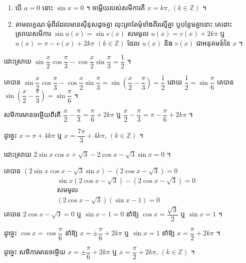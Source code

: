 \begin{note}[សម្គាល់]
\begin{enumerate}[1]
  \item បើ $a = 0$ នោះ $\sin x = 0$ ។ ចម្លើយរបស់សមីការគឺ $x = k\pi$, $(k \in \mathbb{Z})$ ។
  \item តាមលក្ខណៈមុំពីរដែលមានស៊ីនុសដូចគ្នា លុះត្រាតែមុំទាំងពីរស្មើគ្នា ឬបន្ថែមគ្នានោះ គេដោះស្រាយសមីការ $\sin u(x) = \sin v(x)$ សមមូល $u(x) = v(x) + 2k\pi$ ឬ $u(x) = \pi - v(x) + 2k\pi$ $(k \in \mathbb{Z})$ ដែល $u(x)$ និង $v(x)$ ជាអនុគមន៍នៃ $x$ ។
\end{enumerate}
\end{note}

\begin{example}[លំហាត់គំរូ ៣]
ដោះស្រាយ $\sin\dfrac{x}{2}\cos\dfrac{\pi}{3} - \cos\dfrac{x}{2}\sin\dfrac{\pi}{3} = \dfrac{1}{2}$ ។
\end{example}
\ans
គេបាន $\sin\dfrac{x}{2}\cos\dfrac{\pi}{3} - \cos\dfrac{x}{2}\sin\dfrac{\pi}{3} = \sin\left(\dfrac{x}{2} - \dfrac{\pi}{3}\right) = \dfrac{1}{2}$ ដោយ $\dfrac{1}{2} = \sin\dfrac{\pi}{6}$ គេបាន $\sin\left(\dfrac{x}{2} - \dfrac{\pi}{3}\right) = \sin\dfrac{\pi}{6}$ ។

សមីការមានចម្លើយពីរគឺ $\dfrac{x}{2} - \dfrac{\pi}{3} = \dfrac{\pi}{6} + 2k\pi$ ឬ $\dfrac{x}{2} - \dfrac{\pi}{3} = \pi - \dfrac{\pi}{6} + 2k\pi$ ។

ដូច្នេះ $x = \pi + 4k\pi$ ឬ $x = \dfrac{7\pi}{3} + 4k\pi$, $(k \in \mathbb{Z})$ ។

\begin{example}[លំហាត់គំរូ ៤]
ដោះស្រាយ $2\sin x\cos x + \sqrt{3} - 2\cos x - \sqrt{3}\sin x = 0$ ។
\end{example}
\ans
គេបាន $(2\sin x\cos x - \sqrt{3}\sin x) - (2\cos x - \sqrt{3}) = 0$
\[
\begin{gathered}
\sin x(2\cos x - \sqrt{3}) - (2\cos x - \sqrt{3}) = 0\\
\text{សមមូល}\\
(2\cos x - \sqrt{3})(\sin x - 1) = 0
\end{gathered}
\]
គេបាន $2\cos x - \sqrt{3} = 0$ ឬ $\sin x - 1 = 0$ នាំឱ្យ $\cos x = \dfrac{\sqrt{3}}{2}$ ឬ $\sin x = 1$ ។

ដូច្នេះ $\cos x = \cos\dfrac{\pi}{6}$ នាំឱ្យ $x = \pm\dfrac{\pi}{6} + 2k\pi$ ឬ $\sin x = 1$ នាំឱ្យ $x = \dfrac{\pi}{2} + 2k\pi$ ។

ដូច្នេះ សមីការមានចម្លើយ $x = \pm\dfrac{\pi}{6} + 2k\pi$ ឬ $x = \dfrac{\pi}{2} + 2k\pi$, $(k \in \mathbb{Z})$ ។

